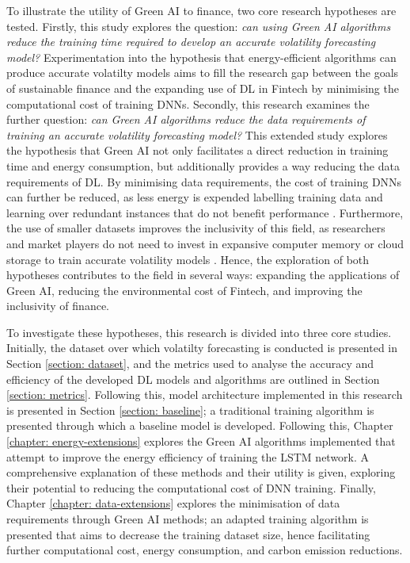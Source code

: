 \documentclass[a4paper, 11pt]{report}
\begin{document}
    To illustrate the utility of Green AI to finance, two core research hypotheses are tested. Firstly, this study explores the question: \emph{can using Green AI algorithms reduce the training time required to develop an accurate volatility forecasting model?} Experimentation into the hypothesis that energy-efficient algorithms can produce accurate volatilty models aims to fill the research gap between the goals of sustainable finance and the expanding use of DL in Fintech by minimising the computational cost of training DNNs. Secondly, this research examines the further question: \emph{can Green AI algorithms reduce the data requirements of training an accurate volatility forecasting model?} This extended study explores the hypothesis that Green AI not only facilitates a direct reduction in training time and energy consumption, but additionally provides a way reducing the data requirements of DL. By minimising data requirements, the cost of training DNNs can further be reduced, as less energy is expended labelling training data and learning over redundant instances that do not benefit performance \citep{schwartz-2019}. Furthermore, the use of smaller datasets improves the inclusivity of this field, as researchers and market players do not need to invest in expansive computer memory or cloud storage to train accurate volatility models \citep{strubell-2019}. Hence, the exploration of both hypotheses contributes to the field in several ways: expanding the applications of Green AI, reducing the environmental cost of Fintech, and improving the inclusivity of finance.

    To investigate these hypotheses, this research is divided into three core studies. Initially, the dataset over which volatilty forecasting is conducted is presented in Section \ref{section: dataset}, and the metrics used to analyse the accuracy and efficiency of the developed DL models and algorithms are outlined in Section \ref{section: metrics}. Following this, model architecture implemented in this research is presented in Section \ref{section: baseline}; a traditional training algorithm is presented through which a baseline model is developed. Following this, Chapter \ref{chapter: energy-extensions} explores the Green AI algorithms implemented that attempt to improve the energy efficiency of training the LSTM network. A comprehensive explanation of these methods and their utility is given, exploring their potential to reducing the computational cost of DNN training. Finally, Chapter \ref{chapter: data-extensions} explores the minimisation of data requirements through Green AI methods; an adapted training algorithm is presented that aims to decrease the training dataset size, hence facilitating further computational cost, energy consumption, and carbon emission reductions.
\end{document}
